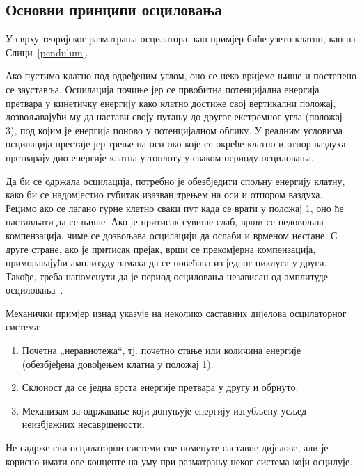 \documentclass[master]{finthesis}
\begin{document}
\subsection{Основни принципи осциловања}
У сврху теоријског разматрања осцилатора, као примјер биће узето клатно, као на Слици~\ref{pendulum}.

Ако пустимо клатно под одређеним углом, оно се неко вријеме њише и постепено се зауставља. Осцилација почиње јер се првобитна потенцијална енергија претвара у кинетичку енергију како клатно достиже свој вертикални положај, дозвољавајући му да настави своју путању до другог екстремног угла (положај 3), под којим је енергија поново у потенцијалном облику. У реалним условима осцилација престаје јер трење на оси око које се окреће клатно и отпор ваздуха претварају дио енергије клатна у топлоту у сваком периоду осциловања. \par
Да би се одржала осцилација, потребно је обезбједити спољну енергију клатну, како би се надомјестио губитак изазван трењем на оси и отпором ваздуха. Рецимо ако се лагано гурне клатно сваки пут када се врати у положај 1, оно ће настављати да се њише. Ако је притисак сувише слаб, врши се недовољна компензација, чиме се дозвољава осцилацији да ослаби и врменом нестане. С друге стране, ако је притисак прејак, врши се прекомјерна компензација, приморавајући амплитуду замаха да се повећава из једног циклуса у други. Такође, треба напоменути да је период осциловања независан од амплитуде осциловања~\cite{Razavi:PLL_CMOS_2020}. \par
Механички примјер изнад указује на неколико саставних дијелова осцилаторног система:
\begin{enumerate}
	\item Почетна „неравнотежа“, тј. почетно стање или количина енергије (обезбјеђена довођењем клатна у положај 1).
	\item Склоност да се једна врста енергије претвара у другу и обрнуто.
	\item Механизам за одржавање који допуњује енергију изгубљену усљед неизбјежних несавршености.
\end{enumerate}
Не садрже сви осцилаторни системи све поменуте саставне дијелове, али је корисно имати ове концепте на уму при разматрању неког система који осцилује. \par
\end{document}
